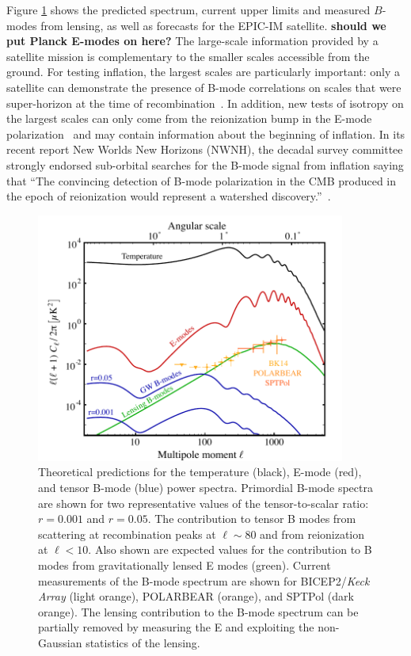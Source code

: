 Figure \ref{fig:clall} shows the predicted spectrum, current upper limits and measured $B$-modes from lensing, as well as forecasts for the EPIC-IM satellite. {\bf should we put Planck E-modes on here?} The large-scale information provided by a satellite mission is complementary to the smaller scales accessible from the ground. For testing inflation, the largest scales are particularly important: only a satellite can demonstrate the presence of B-mode correlations on scales that were super-horizon at the time of recombination~\cite{Lee:2014cya}. In addition, new tests of isotropy on the largest scales can only come from the reionization bump in the E-mode polarization~\cite{} and may contain information about the beginning of inflation. In its recent report New Worlds New Horizons (NWNH), the decadal survey committee strongly endorsed sub-orbital searches for the B-mode signal from inflation saying that ``The convincing detection of B-mode polarization in the CMB produced in the epoch of reionization would represent a watershed discovery.''~\cite{blandford2010}. 


\begin{figure}[h]
\begin{center}
\includegraphics[width=4in]{figs/cmb_powspec_v4.pdf}
\end{center}
\caption{Theoretical predictions for the temperature (black), 
E-mode (red), and tensor B-mode (blue) power spectra. Primordial 
B-mode spectra are shown for two representative values of the tensor-to-scalar
ratio: $r=0.001$ and $r=0.05.$ 
The contribution to tensor B modes from scattering at recombination peaks at $\ell \sim 80$
and from reionization at $\ell < 10$.
Also shown are expected values for the contribution to B modes from gravitationally lensed E modes (green).
Current measurements of the B-mode spectrum are shown for {BICEP}2/{\em Keck Array} (light orange), POLARBEAR (orange), and SPTPol (dark orange). 
The lensing contribution to the B-mode spectrum can be partially removed by measuring the 
E and exploiting the non-Gaussian statistics of the lensing.
}
\label{fig:clall}
\end{figure}



